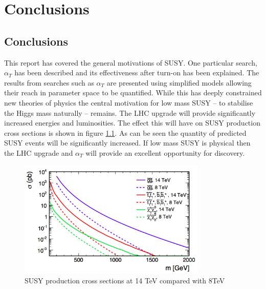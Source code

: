 
\chapter{Conclusions} %

\label{Chapter6} %



\section{Conclusions}
This report has covered the general motivations of SUSY. One particular search, $\alpha_T$ has been described and its effectiveness after turn-on has been explained. The results from searches such as $\alpha_T$ are presented using simplified models allowing their reach in parameter space to be quantified. While this has deeply constrained new theories of physics the central motivation for low mass SUSY -- to stabilise the Higgs mass naturally -- remains. The LHC upgrade will provide significantly increased energies and luminosities. The effect this will have on SUSY production cross sections is shown in figure \ref{snow}\cite{ProjectedCx}. As can be seen the quantity of predicted SUSY events will be significantly increased. If low mass SUSY is physical then the LHC upgrade and $\alpha_T$ will provide an excellent opportunity for discovery. 
\begin{figure}
\centering
    \includegraphics[width=0.8\textwidth]{Figures/snowmass.png}
  \caption{SUSY production cross sections at 14 TeV compared with 8TeV}
  \label{snow}
\end{figure}



